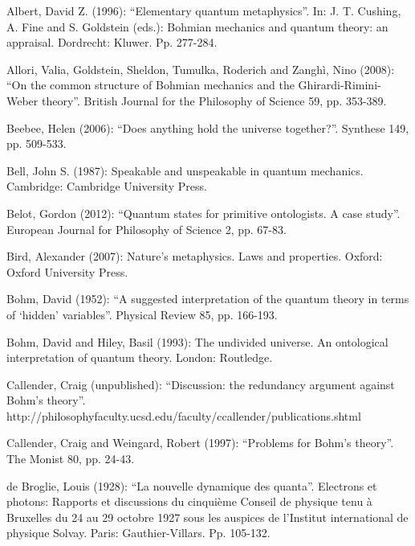 \documentclass[12pt,a4paper]{article}
\theoremstyle{definition}
\begin{document}
\small{
 \noindent  Albert, David Z. (1996): ``Elementary quantum metaphysics''. In: J. T. Cushing, A. Fine and S. Goldstein (eds.): Bohmian mechanics and quantum theory: an appraisal. Dordrecht: Kluwer. Pp. 277-284.

\vspace{0.3cm}   \noindent  Allori, Valia, Goldstein, Sheldon, Tumulka, Roderich and Zangh\`i, Nino (2008): ``On the common structure of Bohmian mechanics and the Ghirardi-Rimini-Weber theory''. British Journal for the Philosophy of Science 59, pp. 353-389.

\vspace{0.3cm}   \noindent  Beebee, Helen (2006): ``Does anything hold the universe together?''. Synthese 149, pp. 509-533. 
  
\vspace{0.3cm}   \noindent  Bell, John S. (1987): Speakable and unspeakable in quantum mechanics. Cambridge: Cambridge University Press. 

\vspace{0.3cm}   \noindent  Belot, Gordon (2012): ``Quantum states for primitive ontologists. A case study''. European Journal for Philosophy of Science 2, pp. 67-83. 

\vspace{0.3cm}   \noindent  Bird, Alexander (2007): Nature's metaphysics. Laws and properties. Oxford: Oxford University Press. 

\vspace{0.3cm}   \noindent  Bohm, David (1952): ``A suggested interpretation of the quantum theory in terms of `hidden' variables''. Physical Review 85, pp. 166-193. 

\vspace{0.3cm}   \noindent  Bohm, David and Hiley, Basil (1993): The undivided universe. An ontological interpretation of quantum theory. London: Routledge. 

\vspace{0.3cm}   \noindent  Callender, Craig (unpublished): ``Discussion: the redundancy argument against Bohm's theory''. \\
http://philosophyfaculty.ucsd.edu/faculty/ccallender/publications.shtml

\vspace{0.3cm}   \noindent  Callender, Craig and Weingard, Robert (1997): ``Problems for Bohm's theory''. The Monist 80, pp. 24-43.

\vspace{0.3cm}   \noindent  de Broglie, Louis (1928): ``La nouvelle dynamique des quanta''. Electrons et photons: Rapports et discussions du cinqui\`eme Conseil de physique tenu \`a Bruxelles du 24 au 29 octobre 1927 sous les auspices de l'Institut international de physique Solvay. Paris: Gauthier-Villars. Pp. 105-132. 

}
\end{document}

